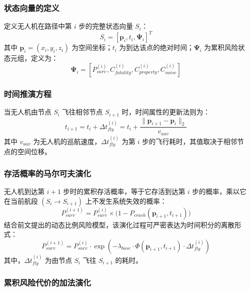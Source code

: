 \subsubsection{状态向量的定义}

定义无人机在路径中第 $i$ 步的完整状态向量 $S_i$：
\begin{equation}
S_i = \left[ \mathbf{p}_i, t_i, \mathbf{\Psi}_i \right]^T
\end{equation}
其中 $\mathbf{p}_i = (x_i, y_i, z_i)$ 为空间坐标；$t_i$ 为到达该点的绝对时间；$\mathbf{\Psi}_i$ 为累积风险状态元组，定义为：
\begin{equation}
\mathbf{\Psi}_i = \left[ P_{surv}^{(i)}, C_{fatality}^{(i)}, C_{property}^{(i)}, C_{noise}^{(i)} \right]
\end{equation}

\subsubsection{时间推演方程}

当无人机由节点 $S_i$ 飞往相邻节点 $S_{i+1}$ 时，时间属性的更新法则为：
\begin{equation}
t_{i+1} = t_i + \Delta t_{fly}^{(i)} = t_i + \frac{\|\mathbf{p}_{i+1} - \mathbf{p}_i\|_2}{v_{uav}}
\end{equation}
其中 $v_{uav}$ 为无人机的巡航速度，$\Delta t_{fly}^{(i)}$ 为第 $i$ 步的飞行耗时，其值取决于相邻节点的空间位移。

\subsubsection{存活概率的马尔可夫演化}

无人机到达第 $i+1$ 步时的累积存活概率，等于它存活到达第 $i$ 步的概率，乘以它在当前航段 $(S_i \rightarrow S_{i+1})$ 上不发生系统失效的概率：
\begin{equation}
P_{surv}^{(i+1)} = P_{surv}^{(i)} \times \big( 1 - P_{crash}(\mathbf{p}_{i+1}, t_{i+1}) \big)
\end{equation}
结合前文提出的动态比例风险模型，该演化过程可严密表达为时间积分的离散形式：
\begin{equation}
P_{surv}^{(i+1)} = P_{surv}^{(i)} \cdot \exp\left( -\lambda_{base} \cdot \Phi(\mathbf{p}_{i+1}, t_{i+1}) \cdot \Delta t_{fly}^{(i)} \right)
\label{eq:surv_evolution}
\end{equation}
其中，$\Delta t_{fly}^{(i)}$ 为由节点 $S_i$ 飞往 $S_{i+1}$ 的耗时。

\subsubsection{累积风险代价的加法演化}


